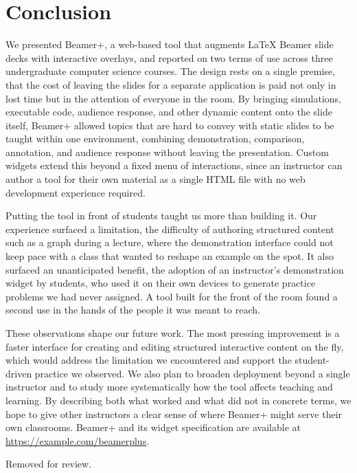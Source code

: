 \documentclass[sigconf]{acmart}
\begin{document}
\section{Conclusion}
\label{sec:conclusion}
We presented Beamer+, a web-based tool that augments \LaTeX{} Beamer slide decks with interactive overlays, and reported on two terms of use across three undergraduate computer science courses. The design rests on a single premise, that the cost of leaving the slides for a separate application is paid not only in lost time but in the attention of everyone in the room. By bringing simulations, executable code, audience response, and other dynamic content onto the slide itself, Beamer+ allowed topics that are hard to convey with static slides to be taught within one environment, combining demonstration, comparison, annotation, and audience response without leaving the presentation. Custom widgets extend this beyond a fixed menu of interactions, since an instructor can author a tool for their own material as a single HTML file with no web development experience required.

Putting the tool in front of students taught us more than building it. Our experience surfaced a limitation, the difficulty of authoring structured content such as a graph during a lecture, where the demonstration interface could not keep pace with a class that wanted to reshape an example on the spot. It also surfaced an unanticipated benefit, the adoption of an instructor's demonstration widget by students, who used it on their own devices to generate practice problems we had never assigned. A tool built for the front of the room found a second use in the hands of the people it was meant to reach.

These observations shape our future work. The most pressing improvement is a faster interface for creating and editing structured interactive content on the fly, which would address the limitation we encountered and support the student-driven practice we observed. We also plan to broaden deployment beyond a single instructor and to study more systematically how the tool affects teaching and learning. By describing both what worked and what did not in concrete terms, we hope to give other instructors a clear sense of where Beamer+ might serve their own classrooms. Beamer+ and its widget specification are available at \url{https://example.com/beamerplus}.

\begin{acks}
Removed for review.
\end{acks}



\end{document}
